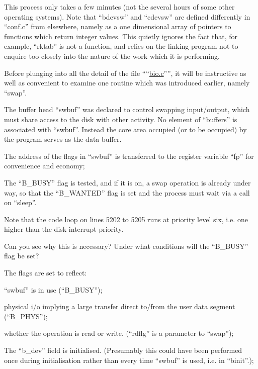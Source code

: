 This process only takes a few minutes
(not the several hours of some other
operating systems). Note that ``bdevsw''
and ``cdevsw'' are defined differently in
``conf.c'' from elsewhere, namely as a
one dimensional array of pointers to
functions which return integer values.
This quietly ignores the fact that, for
example, ``rktab'' is not a function, and
relies on the linking program not to
enquire too closely into the nature of
the work which it is performing.


Before plunging into all the detail of
the file ````\href{./v6/dmr/bio.c}{bio.c}'''', it will be instructive as well as convenient to examine
one routine which was introduced earlier, namely ``swap''.

The buffer head ``swbuf'' was declared to
control swapping input/output, which
must share access to the disk with
other activity. No element of ``buffers''
is associated with ``swbuf''. Instead the
core area occupied (or to be occupied)
by the program serves as the data
buffer.

\bd
\item[5200:] The address of the flags in
``swbuf'' is transferred to the
register variable ``fp'' for convenience and economy;

\item[5202:] The ``B\_BUSY'' flag is tested, and
if it is on, a swap operation is
already under way, so that the
``B\_WANTED'' flag is set and the
process must wait via a call on ``sleep''.
\ed

Note that the code loop on lines
5202 to 5205 runs at priority
level six, i.e. one higher than
the disk interrupt priority.

Can you see why this is necessary? Under what conditions will
the ``B\_BUSY'' flag be set?

\bd
\item[5206:] The flags are set to reflect:

\bi
\item ``swbuf'' is in use (``B\_BUSY'');

\item physical i/o implying a large
transfer direct to/from the user
data segment\\
(``B\_PHYS'');

\item whether the operation is read or
write. (``rdflg'' is a parameter to
``swap'');
\ei

\item[5207:] The ``b\_dev'' field is initialised.
(Presumably this could have been
performed once during initialisation rather than every time
``swbuf'' is used, i.e. in ``binit''.);

